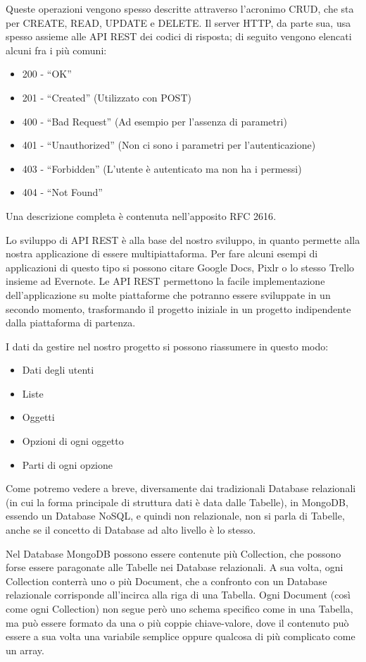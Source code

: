 Queste operazioni vengono spesso descritte attraverso l'acronimo CRUD, che sta per CREATE, READ, UPDATE e DELETE.
Il server HTTP, da parte sua, usa spesso assieme alle API REST dei codici di risposta; di seguito vengono elencati alcuni fra i più comuni:
\begin{itemize}
	\item 200 - “OK”
	\item 201 - “Created” (Utilizzato con POST)
	\item 400 - “Bad Request” (Ad esempio per l'assenza di parametri)
	\item 401 - “Unauthorized” (Non ci sono i parametri per l'autenticazione)
	\item 403 - “Forbidden” (L'utente è autenticato ma non ha i permessi)
	\item 404 - “Not Found”
\end{itemize}
Una descrizione completa è contenuta nell'apposito RFC 2616\cite{RFC2616}.

Lo sviluppo di API REST è alla base del nostro sviluppo, in quanto permette alla nostra applicazione di essere multipiattaforma. Per fare alcuni esempi di applicazioni di questo tipo si possono citare Google Docs, Pixlr o lo stesso Trello insieme ad Evernote. Le API REST permettono la facile implementazione dell'applicazione su molte piattaforme che potranno essere sviluppate in un secondo momento, trasformando il progetto iniziale in un progetto indipendente dalla piattaforma di partenza.

I dati da gestire nel nostro progetto si possono riassumere in questo modo:
\begin{itemize}
	\item Dati degli utenti
	\item Liste
	\item Oggetti
	\item Opzioni di ogni oggetto
	\item Parti di ogni opzione
\end{itemize}
Come potremo vedere a breve, diversamente dai tradizionali Database relazionali (in cui la forma principale di struttura dati è data dalle Tabelle), in MongoDB, essendo un Database NoSQL, e quindi non relazionale, non si parla di Tabelle, anche se il concetto di Database ad alto livello è lo stesso.

Nel Database MongoDB possono essere contenute più Collection, che possono forse essere paragonate alle Tabelle nei Database relazionali. A sua volta, ogni Collection conterrà uno o più Document, che a confronto con un Database relazionale corrisponde all'incirca alla riga di una Tabella. Ogni Document (così come ogni Collection) non segue però uno schema specifico come in una Tabella, ma può essere formato da una o più coppie chiave-valore, dove il contenuto può essere a sua volta una variabile semplice oppure qualcosa di più complicato come un array.


